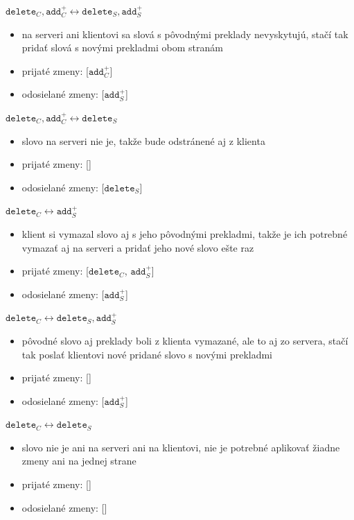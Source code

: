 \documentclass[
  digital, %
  table,   %
  lof,     %
  lot,     %
]{fithesis3}
\begin{document}
\noindent
$\texttt{delete}_{C}, \texttt{add}_{C}^+ \longleftrightarrow \texttt{delete}_{S}, \texttt{add}_{S}^+$
\begin{itemize}
\item na serveri ani klientovi sa slová s pôvodnými preklady nevyskytujú, stačí tak pridať slová s novými prekladmi obom stranám
\item prijaté zmeny: [$\texttt{add}_{C}^+$]
\item odosielané zmeny: [$\texttt{add}_{S}^+$]
\end{itemize}

\noindent
$\texttt{delete}_{C}, \texttt{add}_{C}^+ \longleftrightarrow \texttt{delete}_{S}$
\begin{itemize}
\item slovo na serveri nie je, takže bude odstránené aj z klienta
\item prijaté zmeny: []
\item odosielané zmeny: [$\texttt{delete}_{S}$]
\end{itemize}
\noindent
$\texttt{delete}_{C} \longleftrightarrow \texttt{add}_{S}^+$
\begin{itemize}
\item klient si vymazal slovo aj s jeho pôvodnými prekladmi, takže je ich potrebné vymazať aj na serveri a pridať jeho nové slovo ešte raz
\item prijaté zmeny: [$\texttt{delete}_{C}$, $\texttt{add}_{S}^+$]
\item odosielané zmeny: [$\texttt{add}_{S}^+$]
\end{itemize}

\noindent
$\texttt{delete}_{C} \longleftrightarrow \texttt{delete}_{S}, \texttt{add}_{S}^+$
\begin{itemize}
\item pôvodné slovo aj preklady boli z klienta vymazané, ale to aj zo servera, stačí tak poslať klientovi nové pridané slovo s novými prekladmi
\item prijaté zmeny: []
\item odosielané zmeny: [$\texttt{add}_{S}^+$]
\end{itemize}

\noindent
$\texttt{delete}_{C} \longleftrightarrow \texttt{delete}_{S}$
\begin{itemize}
\item slovo nie je ani na serveri ani na klientovi, nie je potrebné aplikovať žiadne zmeny ani na jednej strane
\item prijaté zmeny: []
\item odosielané zmeny: []
\end{itemize}
\end{document}
